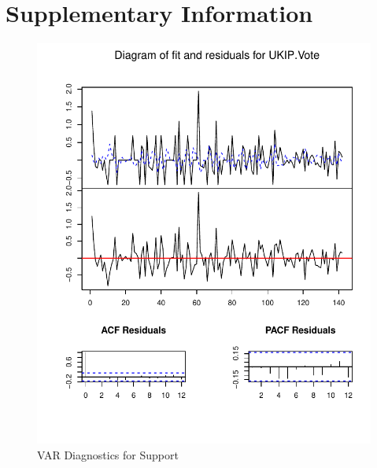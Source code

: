 \documentclass[12pt,]{article}
\makeatletter
\def\maxwidth{\ifdim\Gin@nat@width>\linewidth\linewidth
\else\Gin@nat@width\fi}
\let\Oldincludegraphics\includegraphics
\renewcommand{\includegraphics}[1]{\Oldincludegraphics[width=\maxwidth]{#1}}
\makeatother
\begin{document}
\newpage

\section{Supplementary Information}

\begin{figure}[htbp]
\centering
\includegraphics{ukip_media_files/var-plot-support.pdf}
\caption{VAR Diagnostics for Support}
\end{figure}
\end{document}
